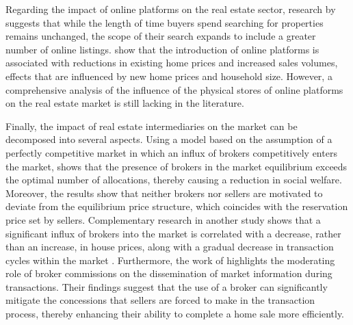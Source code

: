 \documentclass[12pt]{article}
\begin{document}
Regarding the impact of online platforms on the real estate sector, research by \citep{ZUMPANO2003134} suggests that while the length of time buyers spend searching for properties remains unchanged, the scope of their search expands to include a greater number of online listings. \citet{ZHANG2021101104} show that the introduction of online platforms is associated with reductions in existing home prices and increased sales volumes, effects that are influenced by new home prices and household size. However, a comprehensive analysis of the influence of the physical stores of online platforms on the real estate market is still lacking in the literature. 

Finally, the impact of real estate intermediaries on the market can be decomposed into several aspects. Using a model based on the assumption of a perfectly competitive market in which an influx of brokers competitively enters the market, \citet{williams_agency_1998} shows that the presence of brokers in the market equilibrium exceeds the optimal number of allocations, thereby causing a reduction in social welfare. Moreover, the results show that neither brokers nor sellers are motivated to deviate from the equilibrium price structure, which coincides with the reservation price set by sellers. Complementary research in another study shows that a significant influx of brokers into the market is correlated with a decrease, rather than an increase, in house prices, along with a gradual decrease in transaction cycles within the market \citep{https://doi.org/10.1002/jae.2891}. Furthermore, the work of \citep{qu_identifying_2021-1} highlights the moderating role of broker commissions on the dissemination of market information during transactions. Their findings suggest that the use of a broker can significantly mitigate the concessions that sellers are forced to make in the transaction process, thereby enhancing their ability to complete a home sale more efficiently.


\end{document}

